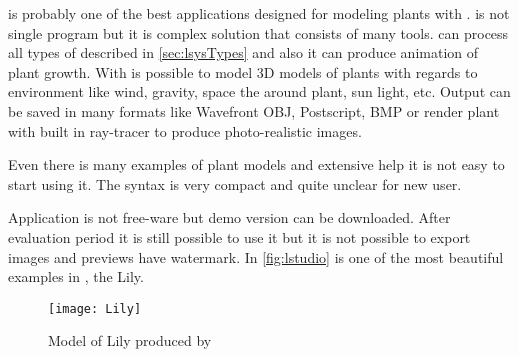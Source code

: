\noindent
\lstudio is probably one of the best applications designed for modeling plants with \lsystems.
\lstudio is not single program but it is complex solution that consists of many tools.
\lstudio can process all types of \lsystems described in \autoref{sec:lsysTypes} and also it can produce animation of plant growth.
With \lstudio is possible to model 3D models of plants with regards to environment like wind, gravity, space the around plant, sun light, etc.
Output can be saved in many formats like Wavefront OBJ, Postscript, BMP or render plant with built in ray-tracer to produce photo-realistic images.

Even there is many examples of plant models and extensive help it is not easy to start using it.
The syntax is very compact and quite unclear for new user.

Application is not free-ware but demo version can be downloaded.
After evaluation period it is still possible to use it but it is not possible to export images and previews have watermark.
In \autoref{fig:lstudio} is one of the most beautiful examples in \lstudio, the Lily.


\begin{figure}[h]
	\centering
	\texttt{[image: Lily]}
	\caption{Model of Lily produced by \lstudio}
	\label{fig:lstudio}
\end{figure}





















